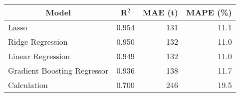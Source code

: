 
\begin{tabular}[t]{lrrr}
\toprule
\multicolumn{1}{c}{Model} & \multicolumn{1}{c}{R$^2$} & \multicolumn{1}{c}{MAE (t)} & \multicolumn{1}{c}{MAPE (\%)}\\
\midrule
Lasso & 0.954 & 131 & 11.1\\
Ridge Regression & 0.950 & 132 & 11.0\\
Linear Regression & 0.949 & 132 & 11.0\\
Gradient Boosting Regressor & 0.936 & 138 & 11.7\\
Calculation & 0.700 & 246 & 19.5\\
\bottomrule
\end{tabular}
